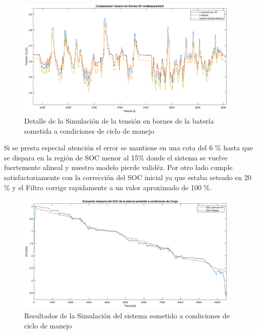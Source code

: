 \documentclass[10pt,a4paper]{article}
\begin{document}
	\begin{figure}[h!]
		\begin{center}
			\includegraphics[width=0.95\textwidth]{Tension_Sim_zoom.eps}
			\caption{Detalle de la Simulación de la tensión en bornes de la batería sometida a condiciones de ciclo de manejo}
			\label{Tension_sim_zoom}
		\end{center}
	\end{figure}
	
	Si se presta especial atención el error se mantiene en una cota del 6 \% hasta que se dispara en la región de SOC menor al 15\% donde el sistema se vuelve fuertemente alineal y nuestro modelo pierde validéz. Por otro lado cumple satisfactoriamente con la corrección del SOC inicial ya que estaba seteado en 20 \% y el Filtro corrige rapidamente a un valor aproximado de 100 \%. 
	
	\begin{figure}[h!]
		\begin{center}
			\includegraphics[width=0.95\textwidth]{Drive_Cycle_1_sim.eps}
			\caption{Resultados de la Simulación del sistema sometido a condiciones de ciclo de manejo}
			\label{Drive_Cycle_1_SOC_sim}
		\end{center}
	\end{figure}
	
\end{document}
